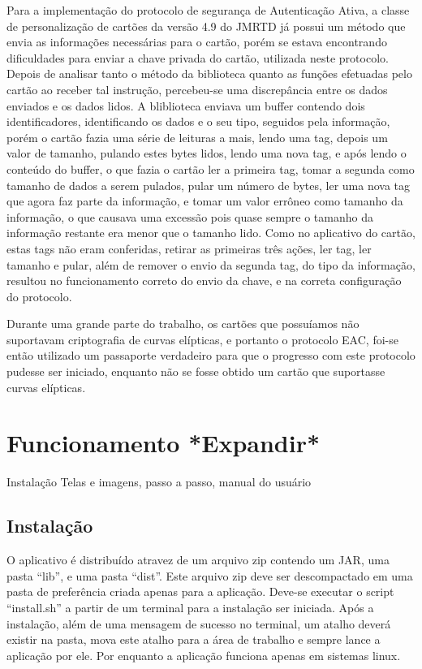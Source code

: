 \documentclass[11pt]{article}
\begin{document}
		Para a implementação do protocolo de segurança de Autenticação Ativa, a classe de personalização de cartões da versão 4.9 do JMRTD já possui um método que envia as informações necessárias para o cartão, porém se estava encontrando dificuldades para enviar a chave privada do cartão, utilizada neste protocolo. Depois de analisar tanto o método da biblioteca quanto as funções efetuadas pelo cartão ao receber tal instrução, percebeu-se uma discrepância entre os dados enviados e os dados lidos. A bliblioteca enviava um buffer contendo dois identificadores, identificando os dados e o seu tipo, seguidos pela informação, porém o cartão fazia uma série de leituras a mais, lendo uma tag, depois um valor de tamanho, pulando estes bytes lidos, lendo uma nova tag, e após lendo o conteúdo do buffer, o que fazia o cartão ler a primeira tag, tomar a segunda como tamanho de dados a serem pulados, pular um número de bytes, ler uma nova tag que agora faz parte da informação, e tomar um valor errôneo como tamanho da informação, o que causava uma excessão pois quase sempre o tamanho da informação restante era menor que o tamanho lido. Como no aplicativo do cartão, estas tags não eram conferidas, retirar as primeiras três ações, ler tag, ler tamanho e pular, além de remover o envio da segunda tag, do tipo da informação, resultou no funcionamento correto do envio da chave, e na correta configuração do protocolo.
		
		Durante uma grande parte do trabalho, os cartões que possuíamos não suportavam criptografia de curvas elípticas, e portanto o protocolo EAC, foi-se então utilizado um passaporte verdadeiro para que o progresso com este protocolo pudesse ser iniciado, enquanto não se fosse obtido um cartão que suportasse curvas elípticas.


		

	\section{Funcionamento *Expandir*} Instalação Telas e imagens, passo a passo, manual do usuário
		\subsection{Instalação}
			
			O aplicativo é distribuído atravez de um arquivo zip contendo um JAR, uma pasta ``lib'', e uma pasta ``dist''. Este arquivo zip deve ser descompactado em uma pasta de preferência criada apenas para a aplicação. Deve-se executar o script ``install.sh'' a partir de um terminal para a instalação ser iniciada. Após a instalação, além de uma mensagem de sucesso no terminal, um atalho deverá existir na pasta, mova este atalho para a área de trabalho e sempre lance a aplicação por ele. Por enquanto a aplicação funciona apenas em sistemas linux.
			
\end{document}
